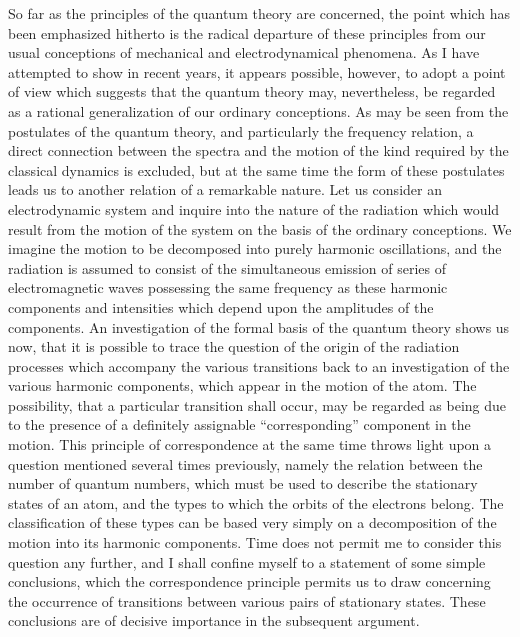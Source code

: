  So far as the principles of the
quantum theory are concerned, the point which has been emphasized
hitherto is the radical departure of these principles from our
usual conceptions of mechanical and electrodynamical phenomena.
As I have attempted to show in recent years, it appears
possible, however, to adopt a point of view which suggests that the
quantum theory may, nevertheless, be regarded as a rational
generalization of our ordinary conceptions. As may be seen from
the postulates of the quantum theory, and particularly the frequency
relation, a direct connection between the spectra and the motion
of the kind required by the classical dynamics is excluded, but at
the same time the form of these postulates leads us to another
relation of a remarkable nature. Let us consider an electrodynamic
system and inquire into the nature of the radiation which would
result from the motion of the system on the basis of the ordinary
conceptions. We imagine the motion to be decomposed into purely
harmonic oscillations, and the radiation is assumed to consist of
the simultaneous emission of series of electromagnetic waves
possessing the same frequency as these harmonic components and
intensities which depend upon the amplitudes of the components.
An investigation of the formal basis of the quantum theory shows
us now, that it is possible to trace the question of the origin of the
radiation processes which accompany the various transitions back
to an investigation of the various harmonic components, which
appear in the motion of the atom. The possibility, that a particular
transition shall occur, may be regarded as being due to the
presence of a definitely assignable ``corresponding'' component in
the motion. This principle of correspondence at the same time
throws light upon a question mentioned several times previously,
namely the relation between the number of quantum numbers,
which must be used to describe the stationary states of an atom,
and the types to which the orbits of the electrons belong. The
classification of these types can be based very simply on a decomposition
of the motion into its harmonic components. Time does
not permit me to consider this question any further, and I shall
confine myself to a statement of some simple conclusions, which
the correspondence principle permits us to draw concerning the
occurrence of transitions between various pairs of stationary states.
These conclusions are of decisive importance in the subsequent
argument.

